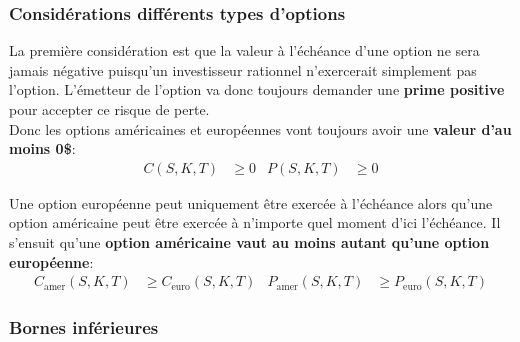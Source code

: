 \documentclass[10pt, french]{article}
\begin{document}
\begin{multicols*}{2}
%
%

\subsubsection*{Considérations différents types d'options}

La première considération est que la valeur à l'échéance d'une option ne sera jamais négative puisqu'un investisseur \og rationnel \fg{} n'exercerait simplement pas l'option. L'émetteur de l'option va donc toujours demander une \textbf{prime positive} pour accepter ce risque de perte.\\

Donc les options américaines et européennes vont toujours avoir une \textbf{valeur d'au moins 0\$}:
\begin{align*}
	C(S, K, T) &\geq	0	&
	P(S, K, T) &\geq	0	
\end{align*}

Une option européenne peut uniquement être exercée à l'échéance alors qu'une option américaine peut être exercée à n'importe quel moment d'ici l'échéance. Il s'ensuit qu'une \textbf{option américaine vaut au moins autant qu'une option européenne}:
\begin{align*}
	C_{\text{amer}}(S, K, T)	&\geq	C_{\text{euro}}(S, K, T)	&
	P_{\text{amer}}(S, K, T)	&\geq	P_{\text{euro}}(S, K, T)	
\end{align*}

\subsubsection*{Bornes inférieures}

\end{multicols*}
\end{document}
